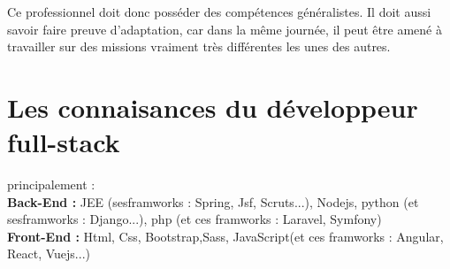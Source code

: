 \documentclass[a4paper, 12pt,french,oneside]{book}%
\theoremstyle{definition}
\theoremstyle{remark}
\begin{document}
Ce professionnel doit donc posséder des compétences généralistes. Il doit aussi savoir faire preuve d’adaptation, car dans la même journée, il peut être amené à travailler sur des missions vraiment très différentes les unes des autres.
\section{Les connaisances du développeur full-stack}
principalement :\\
\textbf{Back-End :} JEE (sesframworks : Spring, Jsf, Scruts...), Nodejs, python (et sesframworks : Django...), php (et ces framworks : Laravel, Symfony)\\
\textbf{Front-End : }Html, Css, Bootstrap,Sass, JavaScript(et
ces framworks : Angular, React, Vuejs...)
\end{document}
